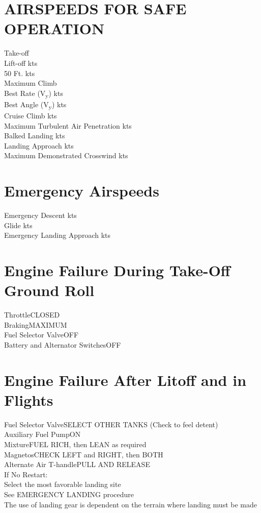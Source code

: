 \documentclass{article}
\begin{document}
\begin{multicols*}{2}
\section*{AIRSPEEDS FOR SAFE OPERATION}
Take-off\\
\hspace*{6mm} Lift-off kts\\
\hspace*{6mm} 50 Ft. kts\\
Maximum Climb\\
\hspace*{6mm} Best Rate (V\textsubscript{y}) kts\\
\hspace*{6mm} Best Angle (V\textsubscript{y}) kts\\
Cruise Climb kts\\
Maximum Turbulent Air Penetration kts\\
Balked Landing kts\\
Landing Approach kts\\
Maximum Demonstrated Crosswind kts
\section*{Emergency Airspeeds}
Emergency Descent kts\\
Glide kts\\
Emergency Landing Approach kts
\section*{Engine Failure During Take-Off Ground Roll}
Throttle\dotfill CLOSED\\
Braking\dotfill MAXIMUM\\
Fuel Selector Valve\dotfill OFF\\
Battery and Alternator Switches\dotfill OFF
\section*{Engine Failure After Litoff and in Flights}
Fuel Selector Valve\dotfill SELECT OTHER TANKS (Check to feel detent)\\
Auxiliary Fuel Pump\dotfill ON\\
Mixture\dotfill FUEL RICH, then LEAN as required\\
Magnetos\dotfill CHECK LEFT and RIGHT, then BOTH\\
Alternate Air T-handle\dotfill PULL AND RELEASE\\
If No Restart:\\
Select the most favorable landing site\\
See EMERGENCY LANDING procedure\\
The use of landing gear is dependent on the terrain where landing must be made

\end{multicols*}
\end{document}
